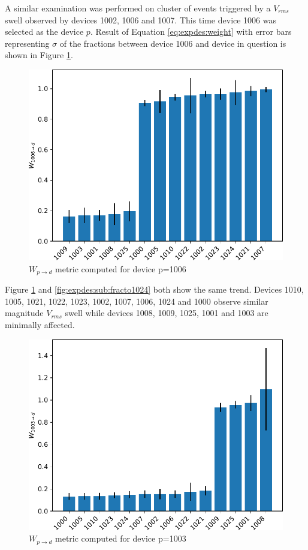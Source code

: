 A similar examination was performed on cluster of events triggered by a $V_{rms}$ swell observed by devices 1002, 1006 and 1007.
This time device 1006 was selected as the device $p$.
Result of Equation \ref{eq:expdes:weight} with error bars representing  $\sigma$ of the fractions between device 1006 and device in question is shown in Figure \ref{fig:expdes:sub:fracto1006}.

\begin{figure}[ht!]
    \centering
    \includegraphics[width=0.8\linewidth]{img/napali_eval/subthreshold/clustering/1006toall.pdf}
    \caption{$W_{p \rightarrow d}$ metric computed for device p=1006}
    \label{fig:expdes:sub:fracto1006}
\end{figure}

Figure \ref{fig:expdes:sub:fracto1006} and \ref{fig:expdes:sub:fracto1024} both show the same trend.
Devices 1010, 1005, 1021, 1022, 1023, 1002, 1007, 1006, 1024 and 1000 observe similar magnitude $V_{rms}$ swell while devices 1008, 1009, 1025, 1001 and 1003 are minimally affected.

\begin{figure}[ht!]
    \centering
    \includegraphics[width=0.8\linewidth]{img/napali_eval/subthreshold/clustering/1003toall.pdf}
    \caption{$W_{p \rightarrow d}$ metric computed for device p=1003}
    \label{fig:expdes:sub:fracto1003}
\end{figure}

